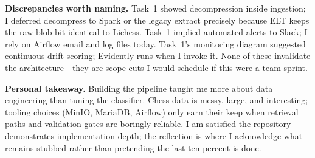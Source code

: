 \textbf{Discrepancies worth naming.} Task~1 showed decompression inside ingestion; I deferred decompress to Spark or the legacy extract precisely because ELT keeps the raw blob bit-identical to Lichess. Task~1 implied automated alerts to Slack; I rely on Airflow email and log files today. Task~1's monitoring diagram suggested continuous drift scoring; Evidently runs when I invoke it. None of these invalidate the architecture---they are scope cuts I would schedule if this were a team sprint.

\textbf{Personal takeaway.} Building the pipeline taught me more about data engineering than tuning the classifier. Chess data is messy, large, and interesting; tooling choices (MinIO, MariaDB, Airflow) only earn their keep when retrieval paths and validation gates are boringly reliable. I am satisfied the repository demonstrates implementation depth; the reflection is where I acknowledge what remains stubbed rather than pretending the last ten percent is done.
